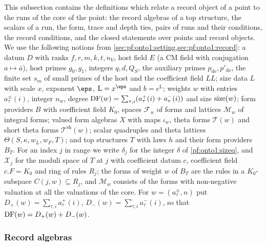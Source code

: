 This subsection contains the definitions which relate a record object of a point to the runs of the core of the
point: the record algebras of a top structure, the scalars of a run, the form, trace and depth ties, pairs of runs
and their conditions, the record conditions, and the closed statements over points and record objects. We use the
following notions from \cref{sec:pf:onto1:setting,sec:pf:onto1:record}: a datum $D$ with ranks $f,r,m,k,t,n_V$, host
field $E$ (a CM field with conjugation $a\mapsto\bar a$), host primes $g_0,g_1$, integers $q,d,Q_S$, the auxiliary
primes $p_{\mathrm{de}},p'_{\mathrm{de}}$, the finite set $s_m$ of small primes of the host and the coefficient field
$\mathit{LL}$; size data $L$ with scale $x$, exponent $\eps$, $\mathrm L=x^{\eps}$ and $b=e^{\mathrm L}$; weights $w$
with entries $a^\pm_\tau(i)$, integer $n_w$, degree $\operatorname{DF}(w)=\sum_{\tau,i}(a^+_\tau(i)+a^-_\tau(i))$ and size
$\operatorname{size}(w)$; form providers $B$ with coefficient field $K_0$, spaces $\mathcal F_w$ of forms and lattices
$\mathcal M_w$ of integral forms; valued form algebras $X$ with maps $\iota_w$, theta forms $\mathcal T(w)$ and short
theta forms $\mathcal T^{\mathrm{sh}}(w)$; scalar quadruples and theta lattices $\Theta(S,\kappa,w_L,w_F,T)$; and top
structures $T$ with laws $h$ and their form providers $B_T$. For an index $j$ in range we write $\delta_j$ for the
integer $\delta$ of \cref{pf:onto1:sizeq}, and $\mathcal X_j$ for the moduli space of $T$ at $j$ with coefficient
datum $c$, coefficient field $c.F=K_0$ and ring of rules $R_j$; the forms of weight $w$ of $B_T$ are the rules in a
$K_0$-subspace $C(j,w)\subseteq R_j$, and $\mathcal M_w$ consists of the forms with non-negative valuation at all the
valuations of the core. For $w=(a^\pm_\tau,n)$ put $D_+(w)=\sum_{\tau,i}a^+_\tau(i)$, $D_-(w)=\sum_{\tau,i}a^-_\tau(i)$,
so that $\operatorname{DF}(w)=D_+(w)+D_-(w)$.

\subsubsection{Record algebras}

